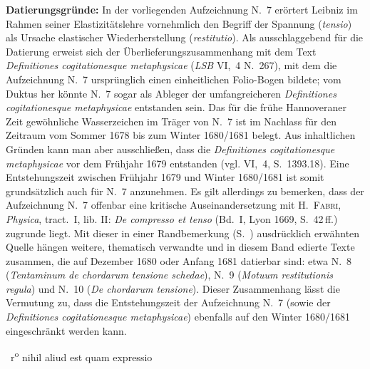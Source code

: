 \begin{ledgroup}
\footnotesize
\pstart
\noindent
\textbf{Datierungsgründe:}\label{LH_35_09_15_001,022_Datierung}
In der vorliegenden Aufzeichnung N.~7 erörtert Leibniz im Rahmen seiner Elastizitätslehre vornehmlich den Begriff der Spannung (\textit{tensio}) als Ursache elastischer Wiederherstellung (\textit{restitutio}).
Als ausschlaggebend für die Datierung erweist sich der Überlieferungszusammenhang mit dem Text \textit{Definitiones cogitationesque metaphysicae} (\textit{LSB} VI,~4 N.~267\cite{01339}),
mit dem die Aufzeichnung N.~7 ursprünglich einen einheitlichen Folio-Bogen bildete; vom Duktus her könnte N.~7 sogar als Ableger der umfangreicheren \textit{Definitiones cogitationesque metaphysicae} entstanden sein.
Das für die frühe Hannoveraner Zeit gewöhnliche Wasserzeichen im Träger von N.~7 ist im Nachlass für den Zeitraum vom Sommer 1678 bis zum Winter 1680/1681 belegt.
Aus inhaltlichen Gründen kann man aber ausschließen, dass die \textit{Definitiones cogitationesque metaphysicae} vor dem Frühjahr 1679 entstanden (vgl. VI,~4, S.~1393.18).
Eine Entstehungszeit zwischen Frühjahr 1679 und Winter 1680/1681 ist somit grundsätzlich auch für N.~7 anzunehmen.
\pend%
\pstart%
Es gilt allerdings zu bemerken, dass der Aufzeichnung N.~7 offenbar eine kritische Auseinandersetzung mit H.~\textsc{Fabri}, \textit{Physica}, tract.~I, lib. II: \textit{De compresso et tenso} (Bd.~I, Lyon 1669, S.~42\,ff.) zugrunde liegt.
Mit dieser in einer Randbemerkung (S.~\pageref{LH_35_09_15_022r_rndbmrkng_czjt}) ausdrücklich erwähnten Quelle hängen weitere, thematisch verwandte und in diesem Band edierte Texte zusammen, die auf Dezember 1680 oder Anfang 1681 datierbar sind: etwa N.~8 (\textit{Tentaminum de chordarum tensione schedae}), N.~9 (\textit{Motuum restitutionis regula}) und N.~10 (\textit{De chordarum tensione}).
Dieser Zusammenhang lässt die Vermutung zu, dass die Entstehungszeit der Aufzeichnung N.~7 (sowie der \textit{Definitiones cogitationesque metaphysicae}\cite{01339}) ebenfalls auf den Winter 1680/1681 eingeschränkt werden kann.
\pend
\end{ledgroup}
%
%
%
%
\frenchspacing%
%
%
\vspace{8mm}
\count{}
\count{}
\count{}
\pstart%
\footnotesize%
\noindent%
%
{\normalsize{~r\textsuperscript{o}\rbrack}}%
%
\protect{}%
nihil aliud est quam expressio\protect{}
